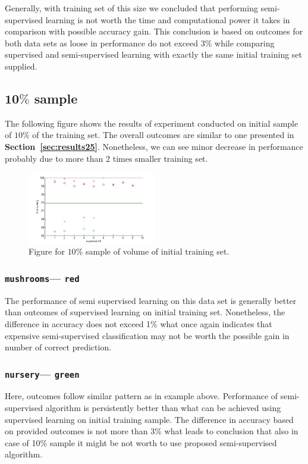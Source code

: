 \documentclass[12pt, a4paper, pdflatex]{report}
\begin{document}
Generally, with training set of this size we concluded that performing semi-supervised learning is not worth the time and computational power it takes in comparison with possible accuracy gain. This conclusion is based on outcomes for both data sets as loose in performance do not exceed 3\% while comparing supervised and semi-supervised learning with exactly the same initial training set supplied.

\subsection{$\mathbf{10\%}$ sample~\cite{results10}\label{sec:results10}}
The following figure shows the results of experiment conducted on initial sample of $10\%$ of the training set. The overall outcomes are similar to one presented in \textbf{Section~\ref{sec:results25}}. Nonetheless, we can see minor decrease in performance probably due to more than 2 times smaller training set.

\begin{figure}[htbp]
\centering
  \includegraphics[width=0.5\textwidth]{graphics/figures/Pfig2.jpg}
\begin{tiny}
\caption{\small Figure for $10\%$ sample of volume of initial training set.\label{img:10pc}}
\end{tiny}
\end{figure}

\subsubsection{\texttt{mushrooms}--- \texttt{red}}
The performance of semi supervised learning on this data set is generally better than outcomes of supervised learning on initial training set. Nonetheless, the difference in accuracy does not exceed 1\% what once again indicates that expensive semi-supervised classification may not be worth the possible gain in number of correct prediction.

\subsubsection{\texttt{nursery}--- \texttt{green}}
Here, outcomes follow similar pattern as in example above. Performance of semi-supervised algorithm is persistently better than what can be achieved using supervised learning on initial training sample. The difference in accuracy based on provided outcomes is not more than 3\% what leads to conclusion that also in case of 10\% sample it might be not worth to use proposed semi-supervised algorithm.
\end{document}
